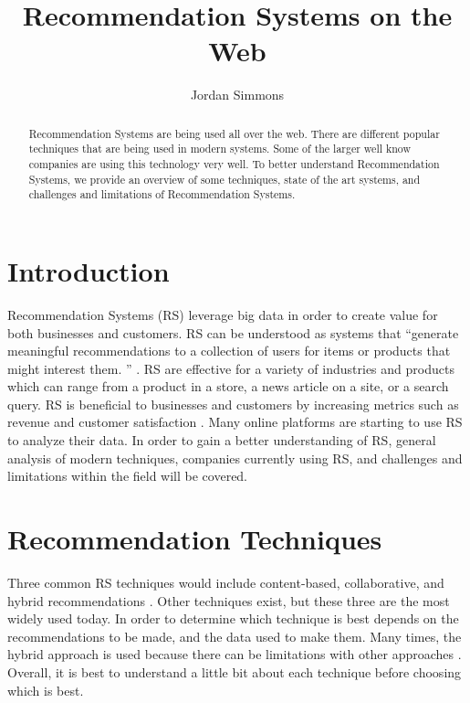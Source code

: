 \documentclass[sigconf]{acmart}
\begin{document}
\title{Recommendation Systems on the Web}


\author{Jordan Simmons}

\renewcommand{\shortauthors}{B. Trovato et al. }


\begin{abstract}
Recommendation Systems are being used all over the web. There are different popular techniques that are being used in modern systems. Some of the larger well know companies are using this technology very well. To better understand Recommendation Systems, we provide an overview of some techniques, state of the art systems, and challenges and limitations of Recommendation Systems. 
\end{abstract}



\maketitle

\section{Introduction}

Recommendation Systems (RS)  leverage big data in order to create value for both businesses and customers. RS can be understood as systems that ``generate meaningful recommendations to a collection of users for items or products that might interest them. '' \cite{Melville2010}. RS are effective for a variety of industries and products which can range from  a product in a store, a news article on a site, or a search query. RS is beneficial to businesses and customers by increasing metrics such as revenue and customer satisfaction \cite{Amatriain2006}. Many online platforms are starting to use RS to analyze their data. In order to gain a better understanding of RS, general analysis of modern techniques, companies currently using RS, and challenges and limitations within the field will be covered. 

\section{Recommendation Techniques}
Three common RS techniques would include content-based, collaborative, and hybrid recommendations \cite{Adomavicius2005}. Other techniques exist, but these three are the most widely used today. In order to
determine which technique is best depends on the recommendations to be made, and the data used to make them. 
Many times, the hybrid approach is used because there can be limitations with other approaches
\cite{Adomavicius2005}. Overall, it is best to understand a little bit about each technique before choosing
which is best. 
\end{document}
